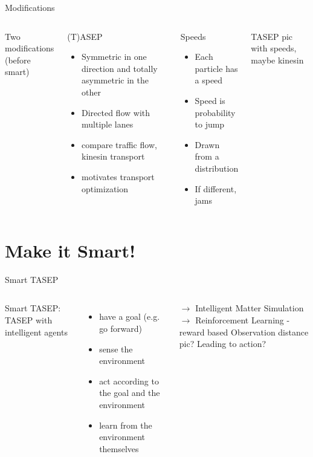\documentclass[10pt,xcolor=table, aspectratio=1610]{beamer}
\begin{document}
\begin{frame}{Modifications}
    \begin{columns}
      Two modifications (before smart)
      \begin{block}{(T)ASEP}
        \begin{itemize}
          \item Symmetric in one direction and totally asymmetric in the other
          \item Directed flow with multiple lanes
          \item compare traffic flow, kinesin transport
          \item motivates transport optimization
        \end{itemize}
      \end{block}
      \begin{block}{Speeds}
        \begin{itemize}
          \item Each particle has a speed
          \item Speed is probability to jump
          \item Drawn from a distribution
          \item If different, jams
        \end{itemize}
      \end{block}
      TASEP pic with speeds, maybe kinesin
    \end{columns}
\end{frame}

\section{Make it Smart!}
\begin{frame}{Smart TASEP}
    \begin{columns}
      Smart TASEP: TASEP with intelligent agents
      \begin{itemize}
        \item have a goal (e.g. go forward)
        \item sense the environment
        \item act according to the goal and the environment
        \item learn from the environment themselves
      \end{itemize}
      $\rightarrow$ Intelligent Matter Simulation \\
      $\rightarrow$ Reinforcement Learning - reward based
      Observation distance pic? Leading to action?
    \end{columns}
\end{frame}
\end{document}
